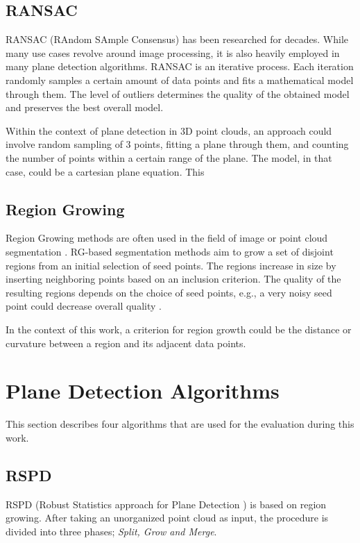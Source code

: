 \documentclass[main.tex]{subfiles}
\begin{document}
\subsection*{RANSAC}
RANSAC (RAndom SAmple Consensus) has been researched for decades. While many use cases revolve around image processing, it is also heavily employed in many plane detection algorithms\cite{Sun_Mordohai_2019,Yang_Forstner,Ashraf_Ahmed_2017}.
RANSAC is an iterative process. Each iteration randomly samples a certain amount of data points and fits a mathematical model through them. The level of outliers determines the quality of the obtained model and preserves the best overall model.

Within the context of plane detection in 3D point clouds, an approach could involve random sampling of 3 points, fitting a plane through them,
 and counting the number of points within a certain range of the plane\cite{Yang_Forstner}. The model, in that case, could be a cartesian plane equation. This 

\subsection*{Region Growing}
Region Growing methods are often used in the field of image or point cloud segmentation \cite{Proença_Gao_2018, Vo_Truong-Hong_Laefer_Bertolotto_2015}.
RG-based segmentation methods aim to grow a set of disjoint regions from an initial selection of seed points. The regions increase in size by inserting neighboring points based on an inclusion criterion.
The quality of the resulting regions depends on the choice of seed points, e.g., a very noisy seed point could decrease overall quality  \cite{Malek_Rahman_Yasiran_Jumaat_Jalil_2012}.

In the context of this work, a criterion for region growth could be the distance or curvature between a region and its adjacent data points.

\section{Plane Detection Algorithms}
This section describes four algorithms that are used for the evaluation during this work. 

\subsection{RSPD}
RSPD (Robust Statistics approach for Plane Detection \cite{Araújo_Oliveira_2020}) is based on region growing. After taking an unorganized point cloud as input, the procedure is divided into three phases;
\textit{Split, Grow and Merge}.
\end{document}
